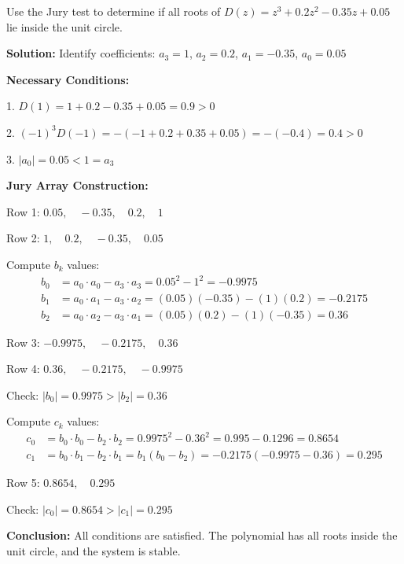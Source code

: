 \begin{example}
Use the Jury test to determine if all roots of $D(z) = z^3 + 0.2z^2 - 0.35z + 0.05$ lie inside the unit circle.

\textbf{Solution:} Identify coefficients: $a_3 = 1$, $a_2 = 0.2$, $a_1 = -0.35$, $a_0 = 0.05$

\textbf{Necessary Conditions:}

1. $D(1) = 1 + 0.2 - 0.35 + 0.05 = 0.9 > 0$ \checkmark

2. $(-1)^3 D(-1) = -(-1 + 0.2 + 0.35 + 0.05) = -(-0.4) = 0.4 > 0$ \checkmark

3. $|a_0| = 0.05 < 1 = a_3$ \checkmark

\textbf{Jury Array Construction:}

Row 1: $0.05, \quad -0.35, \quad 0.2, \quad 1$

Row 2: $1, \quad 0.2, \quad -0.35, \quad 0.05$

Compute $b_k$ values:
\begin{align}
b_0 &= a_0 \cdot a_0 - a_3 \cdot a_3 = 0.05^2 - 1^2 = -0.9975 \\
b_1 &= a_0 \cdot a_1 - a_3 \cdot a_2 = (0.05)(-0.35) - (1)(0.2) = -0.2175 \\
b_2 &= a_0 \cdot a_2 - a_3 \cdot a_1 = (0.05)(0.2) - (1)(-0.35) = 0.36
\end{align}

Row 3: $-0.9975, \quad -0.2175, \quad 0.36$

Row 4: $0.36, \quad -0.2175, \quad -0.9975$

Check: $|b_0| = 0.9975 > |b_2| = 0.36$ \checkmark

Compute $c_k$ values:
\begin{align}
c_0 &= b_0 \cdot b_0 - b_2 \cdot b_2 = 0.9975^2 - 0.36^2 = 0.995 - 0.1296 = 0.8654 \\
c_1 &= b_0 \cdot b_1 - b_2 \cdot b_1 = b_1(b_0 - b_2) = -0.2175(-0.9975 - 0.36) = 0.295
\end{align}

Row 5: $0.8654, \quad 0.295$

Check: $|c_0| = 0.8654 > |c_1| = 0.295$ \checkmark

\textbf{Conclusion:} All conditions are satisfied. The polynomial has all roots inside the unit circle, and the system is stable.
\end{example}

